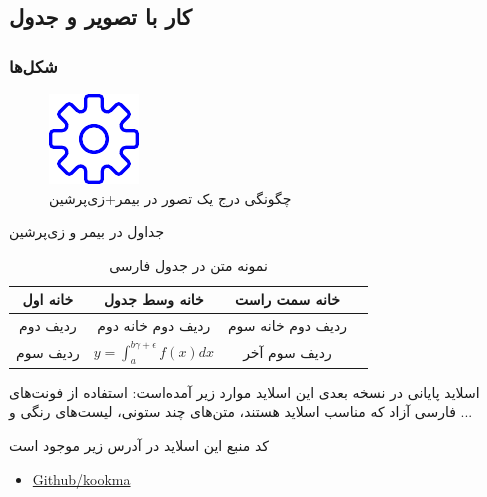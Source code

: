 \documentclass{beamer}
\makeatletter
\newcommand{ \RTList}{\raggedleft\rightskip\@totalleftmargin}
\makeatother
\begin{document}
\begin{persian}
\section{کار با تصویر و جدول}

\begin{frame}
\frametitle{شکل‌ها}
\begin{figure}
	\centering
	\includegraphics[width=0.4\linewidth]{settings-blue.pdf}
	\caption[نمونه تصویر]{چگونگی درج یک تصور در بیمر+زی‌پرشین}
	\label{fig:pic1}
\end{figure}
\end{frame}


\begin{frame}{جداول در بیمر و زی‌پرشین}
\begin{table}
\caption{نمونه متن در جدول فارسی}
\begin{tabular}{|c|c|c|c|}
	\hline 
خانه اول	& خانه وسط جدول &خانه سمت راست    \\ 
	\hline 
ردیف دوم	&  ردیف دوم خانه دوم& ردیف دوم خانه سوم   \\ 
	\hline 
ردیف سوم	&
$ y=\int_{a}^{b\gamma+\epsilon} f(x) dx $
& ردیف سوم آخر   \\ 
	\hline 
\end{tabular} 
\end{table}
\end{frame}

\begin{frame}{اسلاید پایانی}
در نسخه بعدی این اسلاید موارد زیر  آمده‌است: استفاده از فونت‌های فارسی آزاد که مناسب اسلاید هستند، متن‌های چند ستونی، لیست‌های رنگی و ...

کد منبع این اسلاید در آدرس زیر موجود است
\begin{itemize}\RTList
	\item \href{https://github.com/kookma/Persian-Beamer-Templates}{Github/kookma}
\end{itemize}


\end{frame}
\end{persian}
\end{document}
